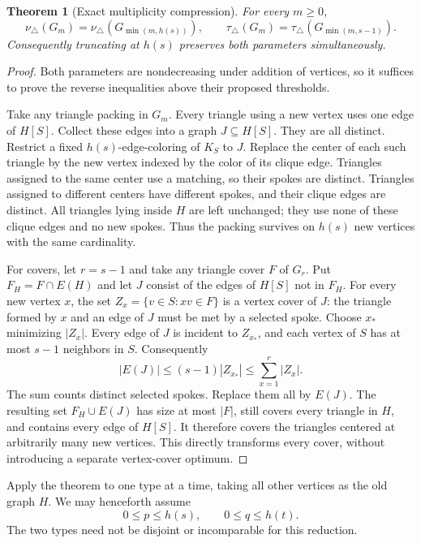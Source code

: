 \documentclass[11pt]{article}
\newtheorem{theorem}{Theorem}
\newcommand{\tp}{\nu_{\triangle}}
\newcommand{\tc}{\tau_{\triangle}}
\begin{document}
\begin{theorem}[Exact multiplicity compression]\label{thm:compression}
For every $m\geq0$,
\[
 \tp(G_m)=\tp(G_{\min(m,h(s))}),\qquad
 \tc(G_m)=\tc(G_{\min(m,s-1)}).
\]
Consequently truncating at $h(s)$ preserves both parameters simultaneously.
\end{theorem}
\begin{proof}
Both parameters are nondecreasing under addition of vertices, so it suffices
to prove the reverse inequalities above their proposed thresholds.

Take any triangle packing in $G_m$. Every triangle using a new vertex uses
one edge of $H[S]$. Collect these edges into a graph $J\subseteq H[S]$.
They are all distinct. Restrict a fixed $h(s)$-edge-coloring of $K_S$ to $J$.
Replace the center of each such triangle by the new vertex indexed by the
color of its clique edge. Triangles assigned to the same center use a matching,
so their spokes are distinct. Triangles assigned to different centers have
different spokes, and their clique edges are distinct. All triangles lying
inside $H$ are left unchanged; they use none of these clique edges and no
new spokes. Thus the packing survives on $h(s)$ new vertices with the same
cardinality.

For covers, let $r=s-1$ and take any triangle cover $F$ of $G_r$.
Put $F_H=F\cap E(H)$ and let $J$ consist of the edges of $H[S]$ not in $F_H$.
For every new vertex $x$, the set $Z_x=\{v\in S:xv\in F\}$ is a vertex cover
of $J$: the triangle formed by $x$ and an edge of $J$ must be met by a
selected spoke. Choose $x_*$ minimizing $|Z_x|$. Every edge of $J$ is
incident to $Z_{x_*}$, and each vertex of $S$ has at most $s-1$ neighbors
in $S$. Consequently
\[
 |E(J)|\leq (s-1)|Z_{x_*}|
 \leq \sum_{x=1}^{r}|Z_x|.
\]
The sum counts distinct selected spokes. Replace them all by $E(J)$.
The resulting set $F_H\cup E(J)$ has size at most $|F|$, still covers every
triangle in $H$, and contains every edge of $H[S]$. It therefore covers the
triangles centered at arbitrarily many new vertices. This directly
transforms every cover, without introducing a separate vertex-cover optimum.
\end{proof}



Apply the theorem to one type at a time, taking all other vertices as
the old graph $H$. We may henceforth assume
\[
 0\leq p\leq h(s),\qquad 0\leq q\leq h(t).
\]
The two types need not be disjoint or incomparable for this reduction.
\end{document}
